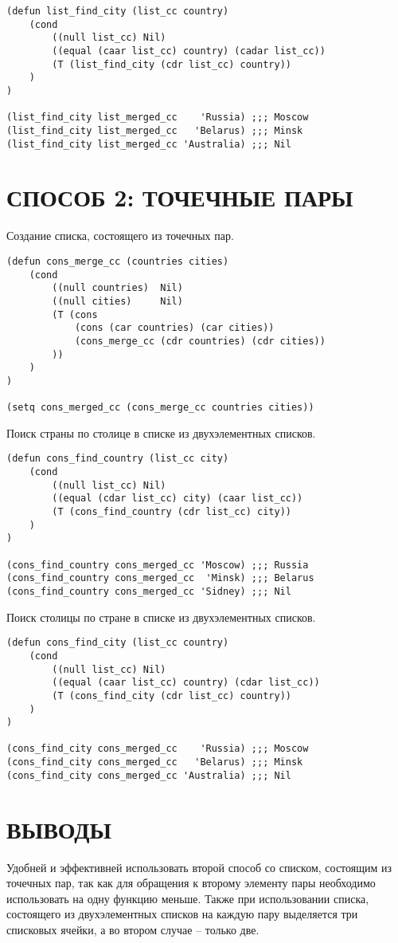 \begin{lstlisting}
(defun list_find_city (list_cc country)
    (cond
        ((null list_cc) Nil)
        ((equal (caar list_cc) country) (cadar list_cc))
        (T (list_find_city (cdr list_cc) country))
    )
)

(list_find_city list_merged_cc    'Russia) ;;; Moscow
(list_find_city list_merged_cc   'Belarus) ;;; Minsk
(list_find_city list_merged_cc 'Australia) ;;; Nil
\end{lstlisting}

\section{СПОСОБ 2: ТОЧЕЧНЫЕ ПАРЫ}

Создание списка, состоящего из точечных пар.

\begin{lstlisting}
(defun cons_merge_cc (countries cities)
    (cond
        ((null countries)  Nil)
        ((null cities)     Nil)
        (T (cons
            (cons (car countries) (car cities))
            (cons_merge_cc (cdr countries) (cdr cities))
        ))
    )
)

(setq cons_merged_cc (cons_merge_cc countries cities))
\end{lstlisting}

Поиск страны по столице в списке из двухэлементных списков.

\begin{lstlisting}
(defun cons_find_country (list_cc city)
    (cond
        ((null list_cc) Nil)
        ((equal (cdar list_cc) city) (caar list_cc))
        (T (cons_find_country (cdr list_cc) city))
    )
)

(cons_find_country cons_merged_cc 'Moscow) ;;; Russia
(cons_find_country cons_merged_cc  'Minsk) ;;; Belarus
(cons_find_country cons_merged_cc 'Sidney) ;;; Nil
\end{lstlisting}

Поиск столицы по стране в списке из двухэлементных списков.

\begin{lstlisting}
(defun cons_find_city (list_cc country)
    (cond
        ((null list_cc) Nil)
        ((equal (caar list_cc) country) (cdar list_cc))
        (T (cons_find_city (cdr list_cc) country))
    )
)

(cons_find_city cons_merged_cc    'Russia) ;;; Moscow
(cons_find_city cons_merged_cc   'Belarus) ;;; Minsk
(cons_find_city cons_merged_cc 'Australia) ;;; Nil
\end{lstlisting}

\section{ВЫВОДЫ}

Удобней и эффективней использовать второй способ со списком,
состоящим из точечных пар, так как для обращения к второму
элементу пары необходимо использовать на одну функцию меньше.
Также при использовании списка, состоящего из двухэлементных списков
на каждую пару выделяется три списковых ячейки, а во втором случае --
только две.
